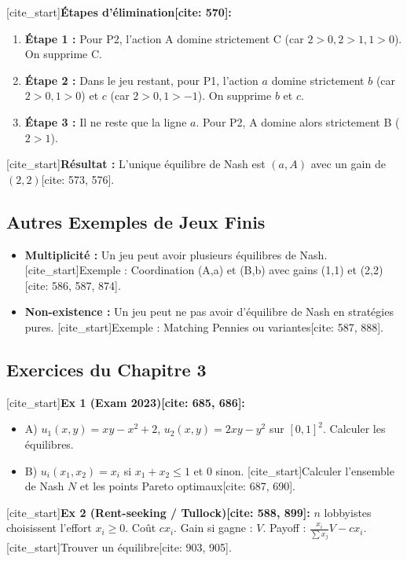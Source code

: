 [cite_start]\textbf{Étapes d'élimination[cite: 570]:}
\begin{enumerate}
    \item \textbf{Étape 1 :} Pour P2, l'action A domine strictement C (car $2>0, 2>1, 1>0$). On supprime C.
    \item \textbf{Étape 2 :} Dans le jeu restant, pour P1, l'action $a$ domine strictement $b$ (car $2>0, 1>0$) et $c$ (car $2>0, 1>-1$). On supprime $b$ et $c$.
    \item \textbf{Étape 3 :} Il ne reste que la ligne $a$. Pour P2, A domine alors strictement B ($2>1$).
\end{enumerate}
[cite_start]\textbf{Résultat :} L'unique équilibre de Nash est $(a, A)$ avec un gain de $(2,2)$[cite: 573, 576].

\subsection{Autres Exemples de Jeux Finis}

\begin{itemize}
    \item \textbf{Multiplicité :} Un jeu peut avoir plusieurs équilibres de Nash. [cite_start]Exemple : Coordination (A,a) et (B,b) avec gains (1,1) et (2,2)[cite: 586, 587, 874].
    \item \textbf{Non-existence :} Un jeu peut ne pas avoir d'équilibre de Nash en stratégies pures. [cite_start]Exemple : Matching Pennies ou variantes[cite: 587, 888].
\end{itemize}

\subsection{Exercices du Chapitre 3}

[cite_start]\textbf{Ex 1 (Exam 2023)[cite: 685, 686]:}
\begin{itemize}
    \item A) $u_1(x,y) = xy - x^2 + 2$, $u_2(x,y) = 2xy - y^2$ sur $[0,1]^2$. Calculer les équilibres.
    \item B) $u_i(x_1, x_2) = x_i$ si $x_1+x_2 \le 1$ et $0$ sinon. [cite_start]Calculer l'ensemble de Nash $N$ et les points Pareto optimaux[cite: 687, 690].
\end{itemize}

[cite_start]\textbf{Ex 2 (Rent-seeking / Tullock)[cite: 588, 899]:} $n$ lobbyistes choisissent l'effort $x_i \ge 0$. Coût $cx_i$. Gain si gagne : $V$. Payoff : $\frac{x_i}{\sum x_j}V - cx_i$. [cite_start]Trouver un équilibre[cite: 903, 905].

